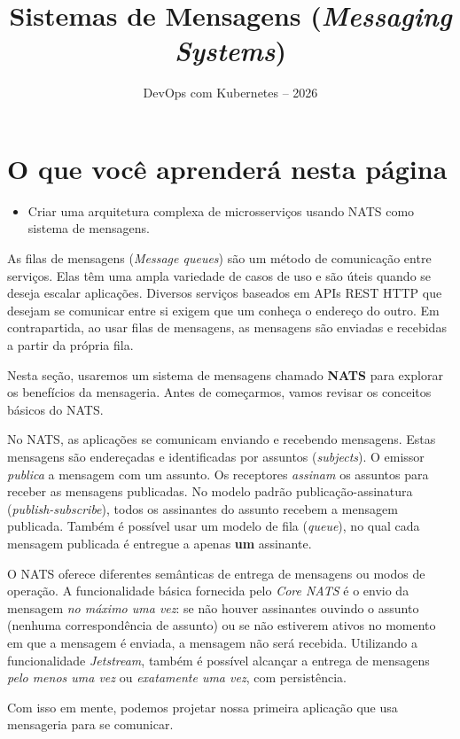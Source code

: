 \documentclass[11pt,a4paper]{article}
\title{\color{secondary}\Huge\textbf{Sistemas de Mensagens (\textit{Messaging Systems})}}
\author{\color{primary}DevOps com Kubernetes -- 2026}
\date{}
\begin{document}
\maketitle

\section*{\color{primary}O que você aprenderá nesta página}
\begin{itemize}
    \item Criar uma arquitetura complexa de microsserviços usando NATS como sistema de mensagens.
\end{itemize}

As filas de mensagens (\textit{Message queues}) são um método de comunicação entre serviços. Elas têm uma ampla variedade de casos de uso e são úteis quando se deseja escalar aplicações. Diversos serviços baseados em APIs REST HTTP que desejam se comunicar entre si exigem que um conheça o endereço do outro. Em contrapartida, ao usar filas de mensagens, as mensagens são enviadas e recebidas a partir da própria fila.

Nesta seção, usaremos um sistema de mensagens chamado \textbf{NATS} para explorar os benefícios da mensageria. Antes de começarmos, vamos revisar os conceitos básicos do NATS.

No NATS, as aplicações se comunicam enviando e recebendo mensagens. Estas mensagens são endereçadas e identificadas por assuntos (\textit{subjects}). O emissor \textit{publica} a mensagem com um assunto. Os receptores \textit{assinam} os assuntos para receber as mensagens publicadas. No modelo padrão publicação-assinatura (\textit{publish-subscribe}), todos os assinantes do assunto recebem a mensagem publicada. Também é possível usar um modelo de fila (\textit{queue}), no qual cada mensagem publicada é entregue a apenas \textbf{um} assinante.

O NATS oferece diferentes semânticas de entrega de mensagens ou modos de operação. A funcionalidade básica fornecida pelo \textit{Core NATS} é o envio da mensagem \textit{no máximo uma vez}: se não houver assinantes ouvindo o assunto (nenhuma correspondência de assunto) ou se não estiverem ativos no momento em que a mensagem é enviada, a mensagem não será recebida. Utilizando a funcionalidade \textit{Jetstream}, também é possível alcançar a entrega de mensagens \textit{pelo menos uma vez} ou \textit{exatamente uma vez}, com persistência.

Com isso em mente, podemos projetar nossa primeira aplicação que usa mensageria para se comunicar.
\end{document}
